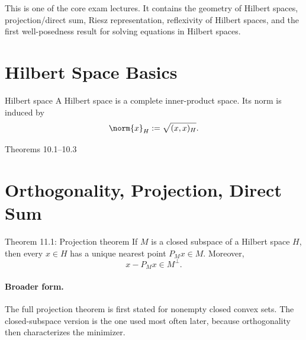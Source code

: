 \documentclass[11pt]{article}
\begin{document}

\vspace{0.8em}

\begin{focusbox}
This is one of the core exam lectures. It contains the geometry of Hilbert spaces, projection/direct sum, Riesz representation, reflexivity of Hilbert spaces, and the first well-posedness result for solving equations in Hilbert spaces.
\end{focusbox}

\tableofcontents

\section{Hilbert Space Basics}

\begin{defbox}{Hilbert space}
A Hilbert space is a complete inner-product space. Its norm is induced by
\[
\norm{x}_H:=\sqrt{(x,x)_H}.
\]
\end{defbox}

\begin{thmbox}{Theorems 10.1--10.3}
\thmInnerProductNorm

\medskip

\thmCauchySchwarz

\medskip

\thmParallelogram
\end{thmbox}

\section{Orthogonality, Projection, Direct Sum}

\begin{thmbox}{Theorem 11.1: Projection theorem}
If $M$ is a closed subspace of a Hilbert space $H$, then every $x\in H$ has a unique nearest point $P_Mx\in M$. Moreover,
\[
x-P_Mx\in M^\perp.
\]
\end{thmbox}

\paragraph{Broader form.}
The full projection theorem is first stated for nonempty closed convex sets. The closed-subspace version is the one used most often later, because orthogonality then characterizes the minimizer.
\end{document}
